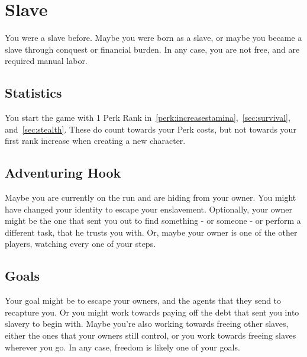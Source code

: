 \section{Slave}\label{background:slave}
You were a slave before. 
Maybe you were born as a slave, or maybe you became a slave through conquest or financial burden.
In any case, you are not free, and are required manual labor.

\subsection{Statistics}
You start the game with 1 Perk Rank in~\ref{perk:increasestamina},~\ref{sec:survival}, and~\ref{sec:stealth}.
These do count towards your Perk costs, but not towards your first rank increase when creating a new character.

\subsection{Adventuring Hook}
Maybe you are currently on the run and are hiding from your owner.
You might have changed your identity to escape your enslavement.
Optionally, your owner might be the one that sent you out to find something -  or someone - or perform a different task, that he trusts you with.
Or, maybe your owner is one of the other players, watching every one of your steps.

\subsection{Goals}
Your goal might be to escape your owners, and the agents that they send to recapture you.
Or you might work towards paying off the debt that sent you into slavery to begin with.
Maybe you're also working towards freeing other slaves, either the ones that your owners still control, or you work towards freeing slaves wherever you go.
In any case, freedom is likely one of your goals.